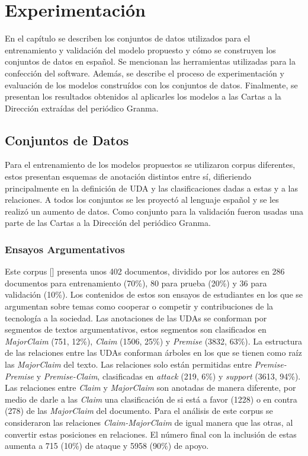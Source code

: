 \chapter{Experimentación}\label{chapter:implementation}

En el capítulo se describen los conjuntos de datos utilizados para el entrenamiento y validación del modelo 
propuesto y cómo se construyen los conjuntos de datos en español. Se mencionan las herramientas utilizadas 
para la confección del software. Además, se describe el 
proceso de experimentación y evaluación de los modelos construídos con los conjuntos de datos. Finalmente,
se presentan los resultados obtenidos al aplicarles los modelos a las Cartas a la Dirección extraídas 
del periódico Granma. 

\section{Conjuntos de Datos}

Para el entrenamiento de los modelos propuestos se utilizaron corpus diferentes, estos
presentan esquemas de anotación distintos entre sí, difieriendo principalmente en la definición de UDA y 
las clasificaciones dadas a estas y a las relaciones. A todos los conjuntos se les proyectó al lenguaje 
español y se les realizó un aumento de datos. Como conjunto para la validación fueron usadas 
una parte de las Cartas a la Dirección del periódico Granma.

\subsection{Ensayos Argumentativos}\label{corpus:persuasive_essays}

Este corpus [\cite{stab2017parsing}] presenta unos 402 documentos, dividido por los autores en 286 documentos para entrenamiento (70\%), 
80 para prueba (20\%) y 36 para validación (10\%). Los contenidos de estos son ensayos de estudiantes en los que 
se argumentan sobre temas como cooperar o competir y contribuciones de la tecnología a la sociedad.
Las anotaciones de las UDAs se conforman por segmentos de textos argumentativos, estos segmentos son 
clasificados en \emph{MajorClaim} (751, 12\%), \emph{Claim} (1506, 25\%) y \emph{Premise} (3832, 63\%).
La estructura de las relaciones entre las UDAs conforman árboles en los que se tienen como raíz las 
\emph{MajorClaim} del texto. Las relaciones solo están permitidas entre \emph{Premise-Premise} y \emph{Premise-Claim}, clasificadas
en \emph{attack} (219, 6\%) y \emph{support} (3613, 94\%). Las relaciones entre \emph{Claim} y \emph{MajorClaim} son anotadas 
de manera diferente, por medio de 
darle a las \emph{Claim} una clasificación de si está a favor (1228) o en contra (278) de las \emph{MajorClaim} del documento.
Para el análisis de este corpus se consideraron las relaciones \emph{Claim-MajorClaim} de igual manera que las otras,
al convertir estas posiciones en relaciones. El número final con la inclusión de estas aumenta a 715 (10\%) de ataque y 
5958 (90\%) de apoyo.

